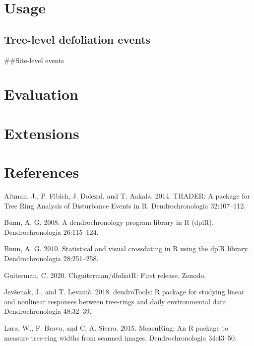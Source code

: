 \documentclass[review]{elsarticle} %
\begin{document}
\hypertarget{usage}{%
\section{Usage}\label{usage}}

\hypertarget{tree-level-defoliation-events}{%
\subsection{Tree-level defoliation
events}\label{tree-level-defoliation-events}}

\#\#Site-level events

\hypertarget{evaluation}{%
\section{Evaluation}\label{evaluation}}

\hypertarget{extensions}{%
\section{Extensions}\label{extensions}}

\hypertarget{references}{%
\section*{References}\label{references}}

\hypertarget{refs}{}
\leavevmode\hypertarget{ref-Altman2014}{}%
Altman, J., P. Fibich, J. Dolezal, and T. Aakala. 2014. TRADER: A
package for Tree Ring Analysis of Disturbance Events in R.
Dendrochronologia 32:107--112.

\leavevmode\hypertarget{ref-Bunn2008}{}%
Bunn, A. G. 2008. A dendrochronology program library in R (dplR).
Dendrochronologia 26:115--124.

\leavevmode\hypertarget{ref-Bunn2010}{}%
Bunn, A. G. 2010. Statistical and visual crossdating in R using the dplR
library. Dendrochronologia 28:251--258.

\leavevmode\hypertarget{ref-chris_guiterman_2020_3626136}{}%
Guiterman, C. 2020. Chguiterman/dfoliatR: First release. Zenodo.

\leavevmode\hypertarget{ref-Jevsenak2018}{}%
Jevšenak, J., and T. Levanič. 2018. dendroTools: R package for studying
linear and nonlinear responses between tree-rings and daily
environmental data. Dendrochronologia 48:32--39.

\leavevmode\hypertarget{ref-Lara2015}{}%
Lara, W., F. Bravo, and C. A. Sierra. 2015. MeasuRing: An R package to
measure tree-ring widths from scanned images. Dendrochronologia
34:43--50.
\end{document}
